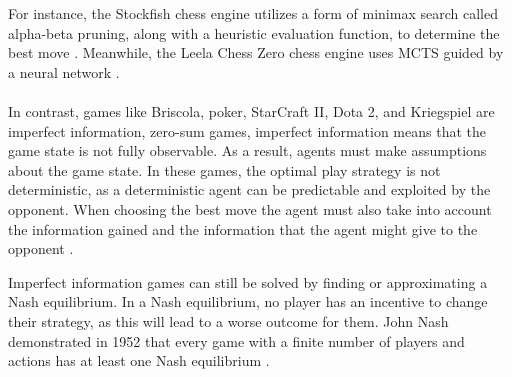 For instance, the Stockfish chess engine utilizes a form of minimax search called alpha-beta pruning, along with a heuristic evaluation function, to determine the best move \cite{stockfish}. Meanwhile, the Leela Chess Zero chess engine uses MCTS guided by a neural network \cite{lc0}.\\\\
In contrast, games like Briscola, poker, StarCraft II, Dota 2, and Kriegspiel are imperfect information, zero-sum games, imperfect information means that the game state is not fully observable. As a result, agents must make assumptions about the game state. In these games, the optimal play strategy is not deterministic, as a deterministic agent can be predictable and exploited by the opponent. When choosing the best move the agent must also take into account the information gained and the information that the agent might give to the opponent \cite{norvig-russell}.

Imperfect information games can still be solved by finding or approximating a Nash equilibrium. In a Nash equilibrium, no player has an incentive to change their strategy, as this will lead to a worse outcome for them. John Nash demonstrated in 1952 that every game with a finite number of players and actions has at least one Nash equilibrium \cite{nash-equilibrium-wikipedia}.


